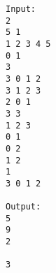 \begin{verbatim}
Input:
2
5 1
1 2 3 4 5
0 1
3
3 0 1 2
3 1 2 3
2 0 1
3 3
1 2 3
0 1
0 2
1 2
1
3 0 1 2

Output:
5
9
2

3 
\end{verbatim}
